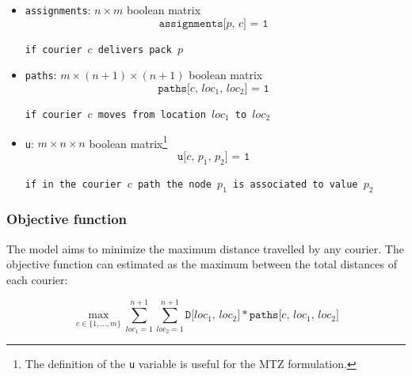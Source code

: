 \begin{itemize}
    \item \texttt{assignments}: $n \times m$ boolean matrix
    \begin{equation}
        \label{eq:assignments}
        \texttt{assignments[$p$, $c$] = 1 }
    \end{equation}
    \begin{center}
        \texttt{if courier $c$ delivers pack $p$}
    \end{center}

    \item \texttt{paths}: $m \times (n+1) \times (n+1)$ boolean matrix
    \begin{equation}
        \label{eq:paths}
        \texttt{paths[$c$, $loc_1$, $loc_2$] = 1 }
    \end{equation}
    \begin{center}
        \texttt{if courier $c$ moves from location $loc_1$ to $loc_2$}
    \end{center}

    \item \texttt{u}: $m \times n \times n$ boolean matrix\footnote{The definition of the \texttt{u} variable is useful for the MTZ formulation.}
    \begin{equation}
        \label{eq:u}
        \texttt{u[$c$, $p_1$, $p_2$] = 1 }
    \end{equation}
    \begin{center}
        \texttt{if in the courier $c$ path the node $p_1$ is associated to value $p_2$}
    \end{center}
    
\end{itemize}

\subsubsection{Objective function}

The model aims to minimize the maximum distance travelled by any courier.
The objective function can estimated as the maximum between the total distances of each courier:

\begin{equation}
    \label{eq:obj_fun}
    \max_{c \in \{ 1, \dots, m \}}
    \sum_{loc_1=1}^{n+1} \sum_{loc_2=1}^{n+1} \texttt{D[$loc_1$, $loc_2$]}*
    \texttt{paths[$c$, $loc_1$, $loc_2$]}
\end{equation}

